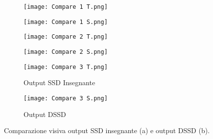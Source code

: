 \begin{figure}[ht] 
    \begin{subfigure}[b]{0.5\linewidth}
      \centering
      \texttt{[image: Compare 1 T.png]} 
      \label{fig7:a} 
    \end{subfigure}%
    \begin{subfigure}[b]{0.5\linewidth}
      \centering
      \texttt{[image: Compare 1 S.png]} 
      \label{fig7:b} 
    \end{subfigure} 
    \begin{subfigure}[b]{0.5\linewidth}
      \centering
      \texttt{[image: Compare 2 T.png]} 
      \label{fig7:c} 
    \end{subfigure}%
    \begin{subfigure}[b]{0.5\linewidth}
      \centering
      \texttt{[image: Compare 2 S.png]} 
      \label{fig7:d} 
    \end{subfigure}
    \begin{subfigure}[b]{0.5\linewidth}
        \centering
        \texttt{[image: Compare 3 T.png]} 
        \caption{Output SSD Insegnante} 
        \label{fig7:d} 
    \end{subfigure}%
    \begin{subfigure}[b]{0.5\linewidth}
        \centering
        \texttt{[image: Compare 3 S.png]} 
        \caption{Output DSSD} 
        \label{fig7:d} 
    \end{subfigure}
    \caption{Comparazione visiva output SSD insegnante (a) e output DSSD (b).}
    \label{fig7} 
\end{figure}

